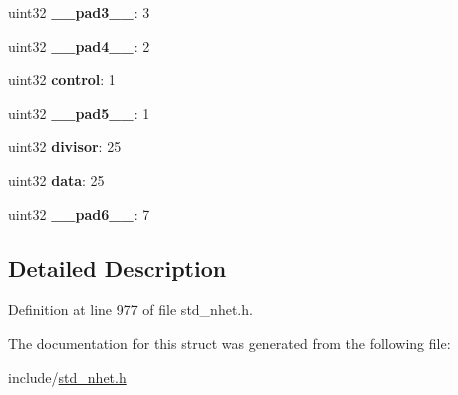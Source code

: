 \begin{DoxyCompactItemize}
\mbox{\label{structrcnt__format_af15d2c26b4e924dcf13724aea31ea54c}} 
uint32 {\bfseries \+\_\+\+\_\+pad3\+\_\+\+\_\+}\+: 3
\item 
\mbox{\label{structrcnt__format_a5b98ac0bdb5c3509ab906aed38e40ba1}} 
uint32 {\bfseries \+\_\+\+\_\+pad4\+\_\+\+\_\+}\+: 2
\item 
\mbox{\label{structrcnt__format_a6330c90143bfe39ef34dc582aa604d3e}} 
uint32 {\bfseries control}\+: 1
\item 
\mbox{\label{structrcnt__format_a326825e907faaa6219cc9a23ebdeeca8}} 
uint32 {\bfseries \+\_\+\+\_\+pad5\+\_\+\+\_\+}\+: 1
\item 
\mbox{\label{structrcnt__format_afa2eb2f03a38b277c7381af5e37926eb}} 
uint32 {\bfseries divisor}\+: 25
\item 
\mbox{\label{structrcnt__format_adeefcea32c2cfdbdca2b121b0e719d6b}} 
uint32 {\bfseries data}\+: 25
\item 
\mbox{\label{structrcnt__format_ac300c37c9b3f684f12a1d15e82f7cfe8}} 
uint32 {\bfseries \+\_\+\+\_\+pad6\+\_\+\+\_\+}\+: 7
\end{DoxyCompactItemize}


\subsection{Detailed Description}


Definition at line 977 of file std\+\_\+nhet.\+h.



The documentation for this struct was generated from the following file\+:\begin{DoxyCompactItemize}
\item 
include/\mbox{\hyperlink{std__nhet_8h}{std\+\_\+nhet.\+h}}\end{DoxyCompactItemize}
